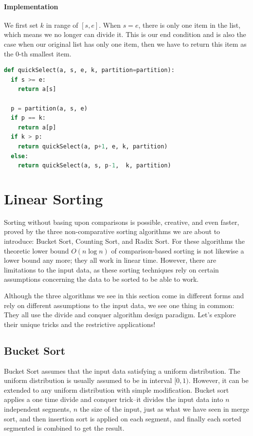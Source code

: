 \documentclass[../main.tex]{subfiles}
\begin{document}
\paragraph{Implementation} We first set $k$ in range of $[s, e]$. When $s=e$, there is only one item in the list, which means we no longer can divide it. This is our end condition and is also the case when our original list has only one item, then we have to return this item as the 0-th smallest item. 
\begin{lstlisting}[language=Python]
def quickSelect(a, s, e, k, partition=partition):
  if s >= e:
    return a[s]

  p = partition(a, s, e) 
  if p == k:
    return a[p]
  if k > p:
    return quickSelect(a, p+1, e, k, partition)
  else:
    return quickSelect(a, s, p-1,  k, partition)
\end{lstlisting}




\section{Linear Sorting}
\label{linear_sorting}
Sorting  without basing upon comparisons is possible, creative, and even faster, proved by the three non-comparative sorting algorithms we are about to introduce: Bucket Sort, Counting Sort, and Radix Sort. 
For these algorithms the theoretic lower bound $O(n\log n)$ of comparison-based sorting is not likewise a lower bound any more; they all work in linear time. However, there are limitations to the input data, as these sorting techniques  rely on certain assumptions concerning the data to be sorted to be able to work. 

Although the three algorithms we see in this section come in different forms and rely on different assumptions to the input data, we see one thing in common: They all use the divide and conquer algorithm design paradigm. Let's explore their unique tricks and the restrictive applications!

\subsection{Bucket Sort}
Bucket Sort assumes that the input data satisfying a uniform distribution. The uniform distribution  is usually assumed to be in interval $[0, 1)$. However, it can be extended to any uniform distribution with simple modification. Bucket sort applies a one time divide and conquer trick--it divides the input data into $n$ independent segments, $n$ the size of the input, just as what we have seen in merge sort, and then insertion sort is applied on each segment, and finally each sorted segmented is combined to get the result. 
\end{document}
